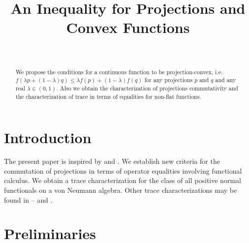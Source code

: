 \documentclass[
11pt,%
tightenlines,%
twoside,%
onecolumn,%
nofloats,%
nobibnotes,%
nofootinbib,%
superscriptaddress,%
noshowpacs,%
centertags]%
{revtex4}
\theoremstyle{definition}
\begin{document}

\title{An Inequality for Projections and Convex Functions}

\author{~}




\begin{abstract}
We propose the conditions for a continuous function to be
projection-convex,  i.e. $f(\lambda p+(1-\lambda)q)\leq \lambda
f(p)+(1-\lambda) f(q)$ for any projections $p$ and $q$ and any real
$\lambda\in (0,1)$. Also we obtain the characterization of
projections commutativity   and the characterization of trace in
terms of equalities for non-flat functions.
\end{abstract}
 

\maketitle



\section{Introduction}

The present paper is inspired by \cite{Bik2011} and \cite{Bik2015}.
We establish new criteria for the commutation
of projections in terms of operator equalities involving functional calculus.
We  obtain  a trace  characterization  for  the  class  of  all  positive normal   functionals  on  a
von Neumann algebra. Other trace characterizations may be found in \cite{B&T}--\cite{PZ88} and \cite{Tik2005}.

\section{Preliminaries}
\end{document}
